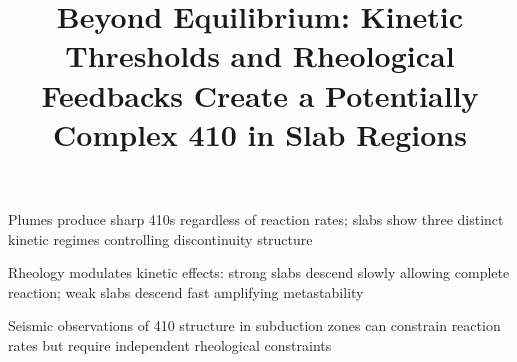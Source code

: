 \documentclass[draft,linenumbers]{agujournal2019}
\begin{document}
\title{Beyond Equilibrium: Kinetic Thresholds and Rheological Feedbacks
Create a Potentially Complex 410 in Slab Regions}




\begin{keypoints}
\item Plumes produce sharp 410s regardless of reaction rates; slabs show
three distinct kinetic regimes controlling discontinuity structure
\item Rheology modulates kinetic effects: strong slabs descend slowly
allowing complete reaction; weak slabs descend fast amplifying
metastability
\item Seismic observations of 410 structure in subduction zones can
constrain reaction rates but require independent rheological constraints
\end{keypoints}
\end{document}
